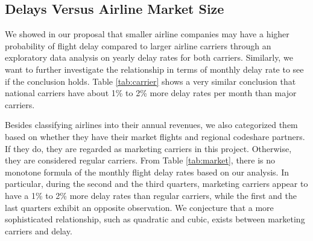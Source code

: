 \documentclass[11pt, letterpaper]{article}
\begin{document}
\subsection{Delays Versus Airline Market Size}
We showed in our proposal that smaller airline companies may have a higher probability of flight delay compared to larger airline carriers through an exploratory data analysis on yearly delay rates for both carriers. Similarly, we want to further investigate the relationship in terms of monthly delay rate to see if the conclusion holds. Table \ref{tab:carrier} shows a very similar conclusion that national carriers have about 1\% to 2\% more delay rates per month than major carriers.
 
\begin{table}[h!]
\centering
{}\caption{Delay Rate (in Percentage) for National Carriers and Major Carriers}\label{tab:carrier}
\end{table}

Besides classifying airlines into their annual revenues, we also categorized them based on whether they have their market flights and regional codeshare partners. If they do, they are regarded as marketing carriers in this project. Otherwise, they are considered regular carriers. From Table \ref{tab:market}, there is no monotone formula of the monthly flight delay rates based on our analysis. In particular, during the second and the third quarters, marketing carriers appear to have a 1\% to 2\% more delay rates than regular carriers, while the first and the last quarters exhibit an opposite observation. We conjecture that a more sophisticated relationship, such as quadratic and cubic, exists between marketing carriers and delay.

\begin{table}[h!]
\centering
{}\caption{Delay Rate (in Percentage) for Marketing Carriers and Regular Carriers}\label{tab:market}
\end{table}
\end{document}
